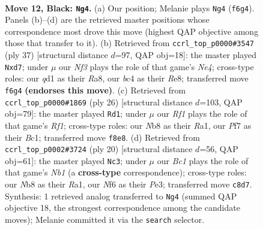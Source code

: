 \documentclass[11pt]{article}
\begin{document}
\clearpage

\begin{figure}[p]\centering
\begin{subfigure}{0.46\textwidth}\centering
\resizebox{\linewidth}{!}{%
\newchessgame
\chessboard[
  setfen={rnb2rk1/pp3ppp/4pn2/8/1qB4P/4PN2/PP1N2P1/R2QK2R b KQ - 0 12},
  showmover=false,
  pgfstyle=straightmove, color=movearrow, markmove={f6-g4}
]}
\caption{}
\end{subfigure}\hfill
\begin{subfigure}{0.46\textwidth}\centering
\resizebox{\linewidth}{!}{%
\newchessgame
\chessboard[
  setfen={r3r1k1/3Bbppp/pq1p4/3Pn3/3Nn3/7P/1PN2PP1/R1BQ1RK1 b - - 0 19},
  showmover=false,
  pgfstyle=straightmove, color=movearrow, markmove={e5-d7}
]}
\caption{}
\end{subfigure}
\\[4pt]
\begin{subfigure}{0.46\textwidth}\centering
\resizebox{\linewidth}{!}{%
\newchessgame
\chessboard[
  setfen={r2qk2r/1p3ppp/2pb1n2/p7/3Q2b1/4PN2/PPB2PPP/R1B2RK1 w kq - 3 14},
  showmover=false,
  pgfstyle=straightmove, color=movearrow, markmove={f1-d1}
]}
\caption{}
\end{subfigure}\hfill
\begin{subfigure}{0.46\textwidth}\centering
\resizebox{\linewidth}{!}{%
\newchessgame
\chessboard[
  setfen={r2qk2r/3n2pp/b2bpn2/1Bpp4/8/4PN2/PP3PPP/RNBQ1RK1 w kq - 0 11},
  showmover=false,
  pgfstyle=straightmove, color=movearrow, markmove={b1-c3}
]}
\caption{}
\end{subfigure}
\caption{\textbf{Move 12, Black: \texttt{Ng4}.} (a) Our position; Melanie plays \texttt{Ng4} (\texttt{f6g4}). Panels (b)--(d) are the retrieved master positions whose correspondence most drove this move (highest QAP objective among those that transfer to it). (b) Retrieved from \texttt{ccrl\_top\_p0000\#3547} (ply 37) [structural distance $d$=97, QAP obj=18]: the master played \texttt{Nxd7}; under $\mu$ our \emph{Nf3} plays the role of that game's \emph{Ne4}; cross-type roles: our \emph{q}d1 as their \emph{R}a8, our \emph{b}c4 as their \emph{R}e8; transferred move \texttt{f6g4} \textbf{(endorses this move)}. (c) Retrieved from \texttt{ccrl\_top\_p0000\#1869} (ply 26) [structural distance $d$=103, QAP obj=79]: the master played \texttt{Rd1}; under $\mu$ our \emph{Rf1} plays the role of that game's \emph{Rf1}; cross-type roles: our \emph{N}b8 as their \emph{R}a1, our \emph{P}f7 as their \emph{B}c1; transferred move \texttt{f8e8}. (d) Retrieved from \texttt{ccrl\_top\_p0002\#3724} (ply 20) [structural distance $d$=56, QAP obj=61]: the master played \texttt{Nc3}; under $\mu$ our \emph{Bc1} plays the role of that game's \emph{Nb1} (a \textbf{cross-type} correspondence); cross-type roles: our \emph{N}b8 as their \emph{R}a1, our \emph{N}f6 as their \emph{P}e3; transferred move \texttt{c8d7}. Synthesis: 1 retrieved analog transferred to \texttt{Ng4} (summed QAP objective 18, the strongest correspondence among the candidate moves); Melanie committed it via the \texttt{search} selector.}
\label{fig:thought-m23}
\end{figure}
\end{document}
